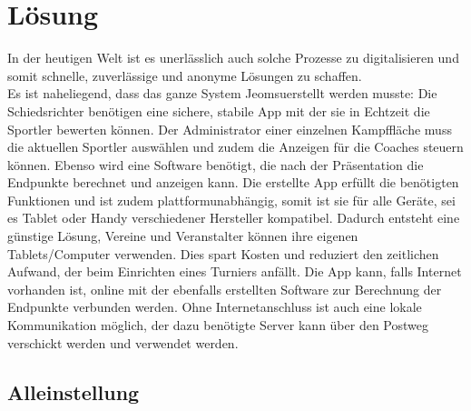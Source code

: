 \section{Lösung}

In der heutigen Welt ist es unerlässlich auch solche Prozesse zu digitalisieren und somit schnelle,
    zuverlässige und anonyme Lösungen zu schaffen.
\\
Es ist naheliegend, dass das ganze System \grqq Jeomsu\grqq erstellt werden musste:
Die Schiedsrichter benötigen eine sichere, stabile App mit der sie in Echtzeit die Sportler bewerten können.
Der Administrator einer einzelnen Kampffläche muss die aktuellen Sportler auswählen und zudem die Anzeigen für die Coaches steuern können.
Ebenso wird eine Software benötigt, die nach der Präsentation die Endpunkte berechnet und anzeigen kann. 
Die erstellte App erfüllt die benötigten Funktionen und ist zudem plattformunabhängig, somit ist sie für alle Geräte,
    sei es Tablet oder Handy verschiedener Hersteller kompatibel.
Dadurch entsteht eine günstige Lösung, Vereine und Veranstalter können ihre eigenen Tablets/Computer verwenden.
Dies spart Kosten und reduziert den zeitlichen Aufwand, der beim Einrichten eines Turniers anfällt.
Die App kann, falls Internet vorhanden ist, online mit der ebenfalls erstellten Software zur Berechnung der Endpunkte verbunden werden.
Ohne Internetanschluss ist auch eine lokale Kommunikation möglich, der dazu benötigte Server kann über den
    Postweg verschickt werden und verwendet werden.

\subsection{Alleinstellung}

